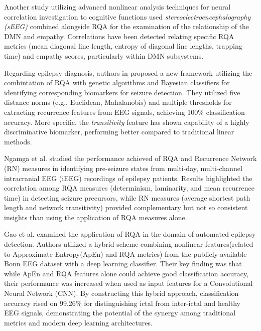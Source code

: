 \documentclass{article}
\begin{document}
			Another study utilizing advanced nonlinear analysis techniques for neural correlation investigation to
			cognitive functions \cite{mo} used \textit{stereoelectroencephalography (sEEG)} combined alongside RQA 
			for the examination of the relationship of the DMN and empathy. 
			Correlations have been detected relating specific RQA metrics 
			(mean diagonal line length, entropy of diagonal line lengths, trapping time) 
			and empathy scores, particularly within DMN subsystems. 

			Regarding epilepsy diagnosis, authors in \cite{palanisamy2024} proposed a new framework 
			utilizing the combintation of RQA with genetic algorithms and Bayesian classifiers for 
			identifying corresponding biomarkers for seizure detection. 
			They utilized five distance norms (e.g., Euclidean, Mahalanobis) and multiple thresholds 
			for extracting recurrence features from EEG signals, achieving 100\% classification accuracy. 
			More specific, the \textit{transitivity} feature has shown capability of a highly discriminative biomarker, 
			performing better compared to traditional linear methods. 

			Ngamga et al.\cite{ngamga2016} studied the performance achieved of RQA and Recurrence Network (RN) measures in identifying 
			pre-seizure states from multi-day, multi-channel intracranial EEG (iEEG) 
			recordings of epilepsy patients. 
			Results highlighted the correlation among RQA measures (determinism, laminarity, and mean recurrence time) in 
			detecting seizure precursors, while RN measures (average shortest path length and network transitivity) provided 
			complementary but not so consistent insights than using the application of RQA measures alone.

			Gao et al.\cite{gao2020automatic} examined the application of RQA 
			in the domain of automated epilepsy detection. 
			Authors utilized a hybrid scheme combining nonlinear features(related to Approximate Entropy(ApEn) and RQA metrics) 
			from the publicly available Bonn EEG dataset\cite{bonndataset} with a deep learning classifier.
			Their key finding was that while ApEn and RQA features alone could 
			achieve good classification accuracy, 
			their performance was increased when used as input 
			features for a Convolutional Neural Network (CNN). By constructing this hybrid approach,
			classification accuracy rised on 99.26\% for distinguishing ictal from inter-ictal 
			and healthy EEG signals, demonstrating the potential of the synergy among traditional metrics
			and modern deep learning architectures.
\end{document}
